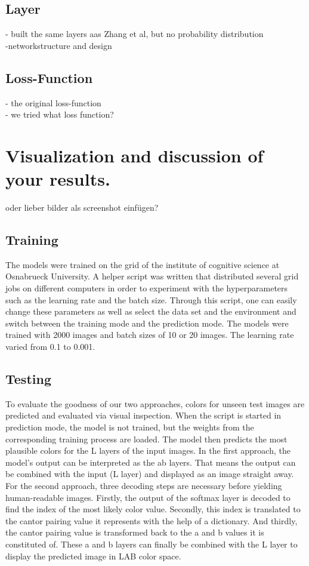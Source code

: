 \documentclass[12pt,letterpaper]{article}
\begin{document}
\subsection{Layer}
- built the same layers aas Zhang et al, but no probability distribution\\
-networkstructure and design\\

\subsection{Loss-Function}
- the original loss-function\\
- we tried what loss function?\\
\section{Visualization and discussion of your results.}
oder lieber bilder als screenshot einfügen?\\
\subsection{Training}
The models were trained on the grid of the institute of cognitive science at Osnabrueck University. A helper script was written that distributed several grid jobs on different computers in order to experiment with the hyperparameters such as the learning rate and the batch size. Through this script, one can easily change these parameters as well as select the data set and the environment and switch between the training mode and the prediction mode. The models were trained with 2000 images and batch sizes of 10 or 20 images. The learning rate varied from 0.1 to 0.001.

\subsection{Testing}
To evaluate the goodness of our two approaches, colors for unseen test images are predicted and evaluated via visual inspection. When the script is started in prediction mode, the model is not trained, but the weights from the corresponding training process are loaded. The model then predicts the most plausible colors for the L layers of the input images.
In the first approach, the model's output can be interpreted as the ab layers. That means the output can be combined with the input (L layer) and displayed as an image straight away.
For the second approach, three decoding steps are necessary before yielding human-readable images. Firstly, the output of the softmax layer is decoded to find the index of the most likely color value. Secondly, this index is translated to the cantor pairing value it represents with the help of a dictionary. And thirdly, the cantor pairing value is transformed back to the a and b values it is constituted of. These a and b layers can finally be combined with the L layer to display the predicted image in LAB color space.
\end{document}
